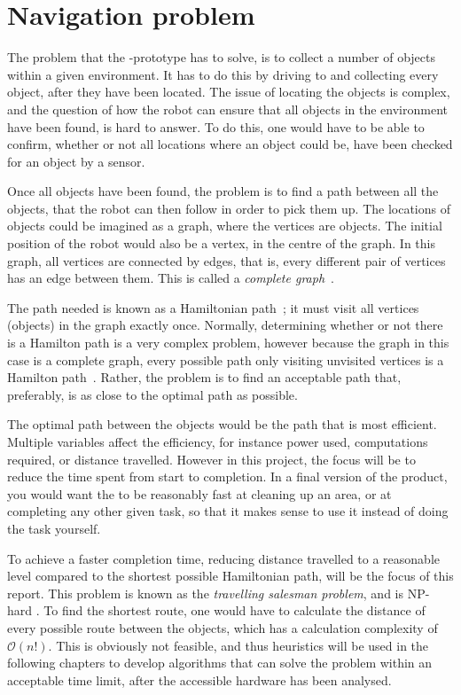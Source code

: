 \section{Navigation problem} \label{sec:problem-description}

The problem that the \projname{}-prototype has to solve, is to collect a number of objects within a given environment. It has to do this by driving to and collecting every object, after they have been located. The issue of locating the objects is complex, and the question of how the robot can ensure that all objects in the environment have been found, is hard to answer. To do this, one would have to be able to confirm, whether or not all locations where an object could be, have been checked for an object by a sensor.

Once all objects have been found, the problem is to find a path between all the objects, that the robot can then follow in order to pick them up. The locations of objects could be imagined as a graph, where the vertices are objects. The initial position of the robot would also be a vertex, in the centre of the graph. In this graph, all vertices are connected by edges, that is, every different pair of vertices has an edge between them. This is called a \emph{complete graph}~\citep{hamilton}.

The path needed is known as a Hamiltonian path~\citep{sipser}; it must visit all vertices (objects) in the graph exactly once. Normally, determining whether or not there is a Hamilton path is a very complex problem, however because the graph in this case is a complete graph, every possible path only visiting unvisited vertices is a Hamilton path~\citep{hamilton}. Rather, the problem is to find an acceptable path that, preferably, is as close to the optimal path as possible.

The optimal path between the objects would be the path that is most efficient. Multiple variables affect the efficiency, for instance power used, computations required, or distance travelled. However in this project, the focus will be to reduce the time spent from start to completion. In a final version of the product, you would want the \projname{} to be reasonably fast at cleaning up an area, or at completing any other given task, so that it makes sense to use it instead of doing the task yourself.

To achieve a faster completion time, reducing distance travelled to a reasonable level compared to the shortest possible Hamiltonian path, will be the focus of this report. This problem is known as the \emph{travelling salesman problem}, and is NP-hard \citep{tsp}. To find the shortest route, one would have to calculate the distance of every possible route between the objects, which has a calculation complexity of $\mathcal{O}(n!)$. This is obviously not feasible, and thus heuristics will be used in the following chapters to develop algorithms that can solve the problem within an acceptable time limit, after the accessible hardware has been analysed. 

